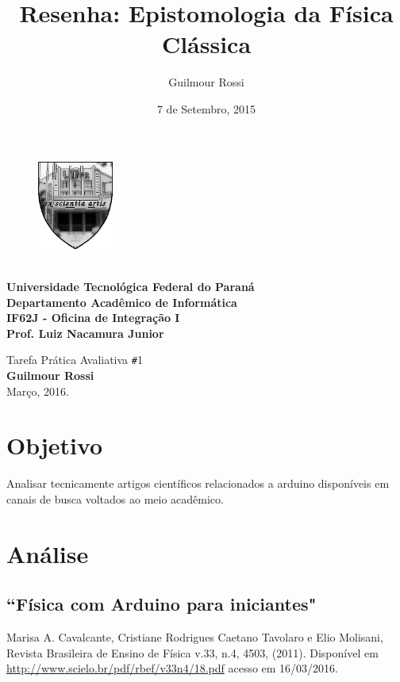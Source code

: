 \documentclass[12pt, a4paper]{article}
\title{Resenha: Epistomologia da Física Clássica}
\author{Guilmour Rossi}
\date{7 de Setembro, 2015}
\begin{document}
     

\begin{minipage}{20cm}
\begin{figure}
\includegraphics[width=2.5cm]{ex_scientia_artis.png}  
\end{figure}

\textbf{\\Universidade Tecnológica Federal do Paraná\\
		Departamento Acadêmico de Informática \\
    	IF62J - Oficina de Integração I \\
    	Prof. Luiz Nacamura Junior \\}

\end{minipage}   
    
       \begin{center}             
        Tarefa Prática Avaliativa \texttt{\#}{1} 
		\textbf{{\\Guilmour Rossi \\}}
        {Março, 2016.\\}		        
   \end{center}  
   


\section{Objetivo}

Analisar tecnicamente artigos científicos relacionados a arduino disponíveis em canais de busca voltados ao meio acadêmico.

\section{Análise}
\subsection{``Física com Arduino para iniciantes"
}
	
Marisa A. Cavalcante, Cristiane Rodrigues Caetano Tavolaro e Elio Molisani, Revista Brasileira de Ensino de Física v.33, n.4, 4503, (2011). Disponível em \url{http://www.scielo.br/pdf/rbef/v33n4/18.pdf} acesso em 16/03/2016.
\end{document}
